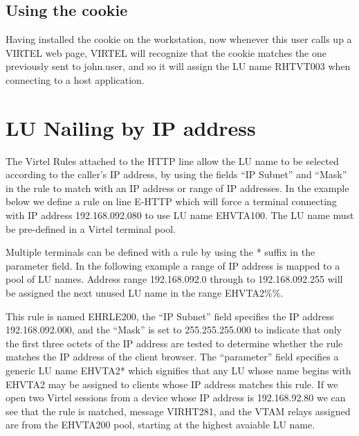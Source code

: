 \documentclass[letterpaper,10pt,english]{sphinxmanual}
\begin{document}
\subsection{Using the cookie}
\label{\detokenize{connectivity_guide:using-the-cookie}}
Having installed the cookie on the workstation, now whenever this user calls up a VIRTEL web page, VIRTEL will recognize that the cookie matches the one previously sent to john.user, and so it will assign the LU name RHTVT003 when connecting to a host application.

\newpage

\ignorespaces 

\section{LU Nailing by IP address}
\label{\detokenize{connectivity_guide:lu-nailing-by-ip-address}}\label{\detokenize{connectivity_guide:index-154}}
The Virtel Rules attached to the HTTP line allow the LU name to be selected according to the caller’s IP address, by using the fields “IP Subnet” and “Mask” in the rule to match with an IP address or range of IP addresses. In the example below we define a rule on line E-HTTP which will force a terminal connecting with IP address 192.168.092.080 to use LU name EHVTA100. The LU name must be pre-defined in a Virtel terminal pool.


Multiple terminals can be defined with a rule by using the * suffix in the parameter field. In the following example a range of IP address is mapped to a pool of LU names. Address range 192.168.092.0 through to 192.168.092.255 will be assigned the next unused LU name in the range EHVTA2\%\%.


This rule is named EHRLE200, the “IP Subnet” field specifies the IP address 192.168.092.000, and the “Mask” is set to 255.255.255.000 to indicate that only the first three octets of the IP address are tested to determine whether the rule matches the IP address of the client browser. The “parameter” field specifies a generic LU name EHVTA2* which signifies that any LU whose name begins with EHVTA2 may be assigned to clients whose IP address matches this rule. If we open two Virtel sessions from a device whose IP address is 192.168.92.80 we can see that the rule is matched, message VIRHT281, and the VTAM relays assigned are from the EHVTA200 pool, starting at the highest avaiable LU name.
\end{document}
